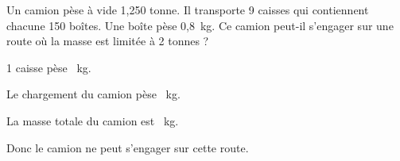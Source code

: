 Un camion pèse à vide 1,250 tonne. Il transporte 9 caisses qui
contiennent chacune 150 boîtes. Une boîte pèse 0,8~kg. Ce camion
peut-il s'engager sur une route où la masse est limitée à 2 tonnes ?
\begin{multicols}{4}
\par 1 caisse pèse ~kg.\columnbreak
\par{}\par Le chargement du camion pèse ~kg.\columnbreak
\par {}\par La masse totale du camion est ~kg.\columnbreak
\par Donc le camion ne peut s'engager sur cette route.
\end{multicols}
